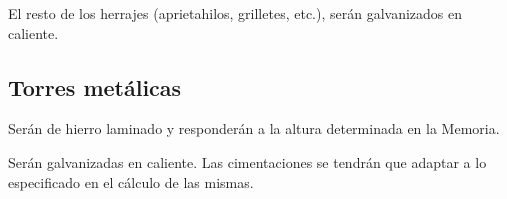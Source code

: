 El resto de los herrajes (aprietahilos, grilletes, etc.), serán galvanizados en caliente.
\subsection{Torres metálicas}
\label{subsec:pliego-torresMAT}
Serán de hierro laminado y responderán a la altura determinada en la Memoria.

Serán galvanizadas en caliente. Las cimentaciones se tendrán que adaptar a lo especificado en el cálculo de las mismas.


